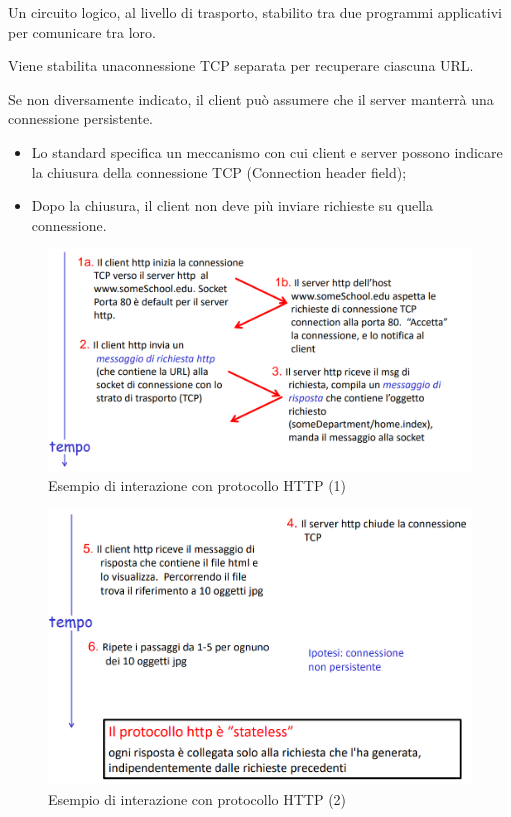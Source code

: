 \begin{definition}[Connessione]
    Un circuito logico, al livello di trasporto, stabilito tra due programmi applicativi per comunicare tra loro.    
\end{definition}
\begin{definition}
    Viene stabilita unaconnessione TCP separata per recuperare ciascuna URL.
\end{definition}
\begin{definition}
    Se non diversamente indicato, il client può assumere che il server manterrà una connessione persistente.
    \begin{itemize}
        \item Lo standard specifica un meccanismo con cui client e server possono indicare la chiusura della connessione TCP (Connection header field);
        \item Dopo la chiusura, il client non deve più inviare richieste su quella connessione.
    \end{itemize}
\end{definition}

\newblock

\begin{figure}
    \centering
    \includegraphics[scale=0.35]{Immagini/Esempio_richiesta_HTTP.png}
    \caption{Esempio di interazione con protocollo HTTP (1)}
\end{figure}

\begin{figure}[h]
    \centering
    \includegraphics[scale=0.35]{Immagini/Esempio_richiesta_HTTP_2.png}
    \caption{Esempio di interazione con protocollo HTTP (2)}
\end{figure}

